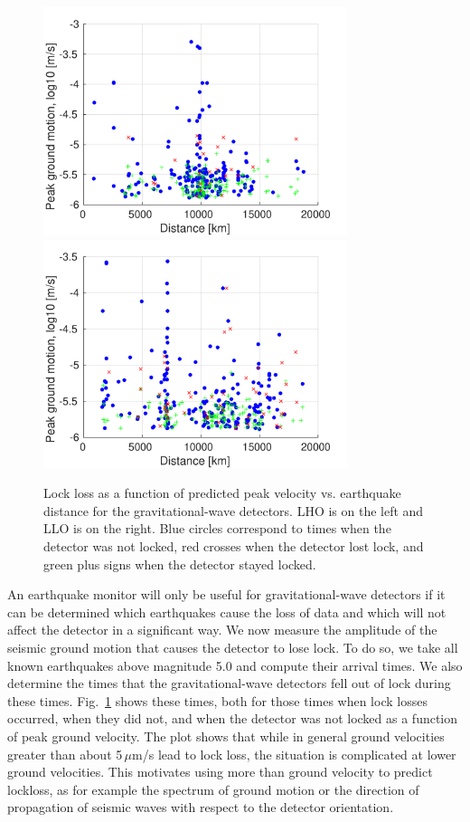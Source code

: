 \documentclass[twocolumn, aps, superscriptaddress]{revtex4}
\begin{document}
\begin{figure}[t]
\hspace*{-0.5cm}
 \includegraphics[width=3.5in]{lockloss_vel_distance_LHO.pdf}
  \includegraphics[width=3.5in]{lockloss_vel_distance_LLO.pdf}
 \caption{Lock loss as a function of predicted peak velocity vs. earthquake distance for the gravitational-wave detectors. LHO is on the left and LLO is on the right. Blue circles correspond to times when the detector was not locked, red crosses when the detector lost lock, and green plus signs when the detector stayed locked.}
 \label{fig:lockloss}
\end{figure}

An earthquake monitor will only be useful for gravitational-wave detectors if it can be determined which earthquakes cause the loss of data and which will not affect the detector in a significant way.
We now measure the amplitude of the seismic ground motion that causes the detector to lose lock. To do so, we take all known earthquakes above magnitude 5.0 and compute their arrival times. 
We also determine the times that the gravitational-wave detectors fell out of lock during these times. 
Fig.~\ref{fig:lockloss} shows these times, both for those times when lock losses occurred, when they did not, and when the detector was not locked as a function of peak ground velocity. 
The plot shows that while in general ground velocities greater than about 5\,$\mu$m/s lead to lock loss, the situation is complicated at lower ground velocities. This motivates using more than ground velocity to predict lockloss, as for example the spectrum of ground motion or the direction of propagation of seismic waves with respect to the detector orientation.
\end{document}

